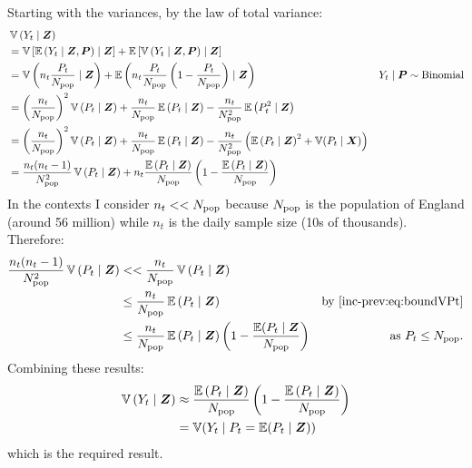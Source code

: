 \documentclass[thesis.tex]{subfiles}
\begin{document}
Starting with the variances, by the law of total variance:
\begin{align}
  &\operatorname{\mathbb{V}}\left( Y_t \mid \bm{Z} \right) \\
    &= \operatorname{\mathbb{V}}\left[\operatorname{\mathbb{E}}\left( Y_t \mid \bm{Z}, \bm{P} \right) \mid \bm{Z} \right] + \operatorname{\mathbb{E}}\left[\operatorname{\mathbb{V}}\left( Y_t \mid \bm{Z}, \bm{P} \right) \mid \bm{Z} \right] \\
    &= \operatorname{\mathbb{V}}\left( n_t \frac{P_t}{N_\text{pop}} \mid \bm{Z} \right) + \operatorname{\mathbb{E}}\left( n_t \frac{P_t}{N_\text{pop}} \left(1 - \frac{P_t}{N_\text{pop}} \right) \mid \bm{Z} \right) &Y_t \mid \bm{P} \sim \operatorname{Binomial} \\
    &= \left( \frac{n_t}{N_\text{pop}} \right)^2 \operatorname{\mathbb{V}}\left(P_t \mid \bm{Z} \right) + \frac{n_t}{N_\text{pop}} \operatorname{\mathbb{E}}\left(P_t \mid \bm{Z} \right)  - \frac{n_t}{N_\text{pop}^2} \operatorname{\mathbb{E}}\left(P_t^2 \mid \bm{Z} \right) \\
    &= \left( \frac{n_t}{N_\text{pop}} \right)^2 \operatorname{\mathbb{V}}\left(P_t \mid \bm{Z} \right) + \frac{n_t}{N_\text{pop}} \operatorname{\mathbb{E}}\left(P_t \mid \bm{Z} \right)  - \frac{n_t}{N_\text{pop}^2} \left(\operatorname{\mathbb{E}}\left(P_t \mid \bm{Z} \right) ^ 2 + \operatorname{\mathbb{V}}(P_t \mid \bm{X})\right) \\
    &= \frac{n_t(n_t - 1)}{N_\text{pop}^2} \operatorname{\mathbb{V}}\left(P_t \mid \bm{Z} \right) + n_t \frac{\operatorname{\mathbb{E}}\left(P_t \mid \bm{Z} \right)}{N_\text{pop}}\left(1 - \frac{\operatorname{\mathbb{E}}\left(P_t \mid \bm{Z} \right)}{N_\text{pop}} \right) \\
\end{align}
In the contexts I consider $n_t << N_\text{pop}$ because $N_\text{pop}$ is the population of England (around 56 million) while $n_t$ is the daily sample size (10s of thousands).
Therefore:
\begin{align}
    \frac{n_t(n_t - 1)}{\Npop^2} \var\left(P_t \mid \vec{Z} \right)
    &<< \frac{n_t}{\Npop} \var\left(P_t \mid \vec{Z} \right) \\
    &\leq \frac{n_t}{\Npop} \E\left(P_t \mid \vec{Z} \right) &\text{by \cref{inc-prev:eq:boundVPt}} \\ 
    &\leq \frac{n_t}{\Npop} \E\left(P_t \mid \vec{Z} \right) \left(1 - \frac{\E(P_t \mid \vec{Z}}{\Npop} \right) &\text{as $P_t \leq \Npop$.}
\end{align}
Combining these results:
\begin{align}
  \operatorname{\mathbb{V}}\left( Y_t \mid \bm{Z} \right)
    &\approx \frac{\operatorname{\mathbb{E}}\left(P_t \mid \bm{Z} \right)}{N_\text{pop}}\left(1 - \frac{\operatorname{\mathbb{E}}\left(P_t \mid \bm{Z} \right)}{N_\text{pop}} \right) \\
    &= \operatorname{\mathbb{V}}(Y_t \mid P_t = \operatorname{\mathbb{E}}(P_t \mid \bm{Z}))
\end{align}
which is the required result.
\end{document}
